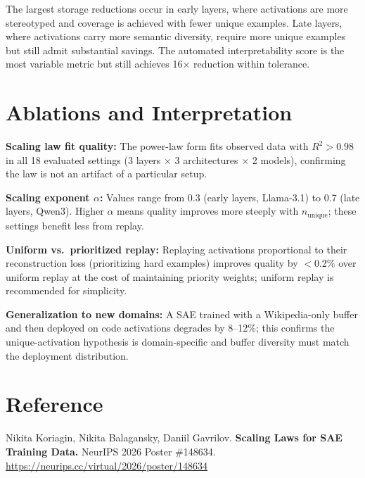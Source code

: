 \documentclass[10pt,twocolumn]{article}
\begin{document}
The largest storage reductions occur in early layers, where activations are more
stereotyped and coverage is achieved with fewer unique examples. Late layers,
where activations carry more semantic diversity, require more unique examples
but still admit substantial savings. The automated interpretability score is
the most variable metric but still achieves 16$\times$ reduction within tolerance.

\section{Ablations and Interpretation}

\textbf{Scaling law fit quality:} The power-law form fits observed data with
$R^2 > 0.98$ in all 18 evaluated settings (3 layers $\times$ 3 architectures
$\times$ 2 models), confirming the law is not an artifact of a particular setup.

\textbf{Scaling exponent $\alpha$:} Values range from 0.3 (early layers, Llama-3.1)
to 0.7 (late layers, Qwen3). Higher $\alpha$ means quality improves more steeply
with $n_\text{unique}$; these settings benefit less from replay.

\textbf{Uniform vs.\ prioritized replay:} Replaying activations proportional to
their reconstruction loss (prioritizing hard examples) improves quality by
$<$0.2\% over uniform replay at the cost of maintaining priority weights;
uniform replay is recommended for simplicity.

\textbf{Generalization to new domains:} A SAE trained with a Wikipedia-only buffer
and then deployed on code activations degrades by 8--12\%; this confirms the
unique-activation hypothesis is domain-specific and buffer diversity must match
the deployment distribution.

\section*{Reference}

Nikita Koriagin, Nikita Balagansky, Daniil Gavrilov.
\textbf{Scaling Laws for SAE Training Data.}
NeurIPS 2026 Poster \#148634.
\url{https://neurips.cc/virtual/2026/poster/148634}
\end{document}
